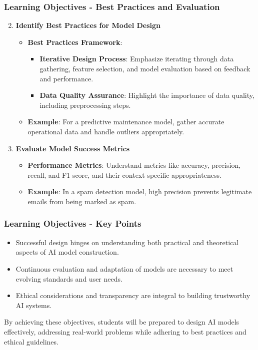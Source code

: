 \documentclass[aspectratio=169]{beamer}
\begin{document}
\begin{frame}[fragile]
    \frametitle{Learning Objectives - Best Practices and Evaluation}
    \begin{enumerate}
        \setcounter{enumi}{1}
        \item \textbf{Identify Best Practices for Model Design}
        \begin{itemize}
            \item \textbf{Best Practices Framework}:
            \begin{itemize}
                \item \textbf{Iterative Design Process}: Emphasize iterating through data gathering, feature selection, and model evaluation based on feedback and performance.
                \item \textbf{Data Quality Assurance}: Highlight the importance of data quality, including preprocessing steps.
            \end{itemize}
            \item \textbf{Example}: For a predictive maintenance model, gather accurate operational data and handle outliers appropriately.
        \end{itemize}
        
        \item \textbf{Evaluate Model Success Metrics}
        \begin{itemize}
            \item \textbf{Performance Metrics}: Understand metrics like accuracy, precision, recall, and F1-score, and their context-specific appropriateness.
            \item \textbf{Example}: In a spam detection model, high precision prevents legitimate emails from being marked as spam.
        \end{itemize}
    \end{enumerate}
\end{frame}

\begin{frame}[fragile]
    \frametitle{Learning Objectives - Key Points}
    \begin{itemize}
        \item Successful design hinges on understanding both practical and theoretical aspects of AI model construction.
        \item Continuous evaluation and adaptation of models are necessary to meet evolving standards and user needs.
        \item Ethical considerations and transparency are integral to building trustworthy AI systems.
    \end{itemize}
    By achieving these objectives, students will be prepared to design AI models effectively, addressing real-world problems while adhering to best practices and ethical guidelines.
\end{frame}
\end{document}
